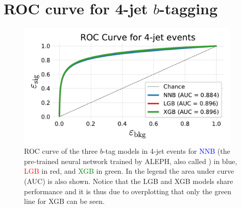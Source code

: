 \section[ROC curve for 4-jet b-tagging]{ROC curve for 4-jet $b$-tagging}
\begin{figure}
  \includegraphics[width=0.95\textwidth, trim=10 10 10 40, clip]{figures/quarks/ROC_4_jet-down_sample=1.00-ML_vars=vertex-selection=b-ejet_min=4-n_iter_RS_lgb=99-n_iter_RS_xgb=9-cdot_cut=0.90-version=19.pdf}
  \vspace{-0.5cm}
  \caption[ROC curve for 4-jet $b$-tagging]
          {ROC curve of the three $b$-tag models in 4-jet events for \textcolor{blue}{NNB} (the pre-trained neural network trained by ALEPH, also called ) in blue, \textcolor{red}{LGB} in red, and \textcolor{green}{XGB} in green. In the legend the area under curve (AUC) is also shown. Notice that the LGB and XGB models share performance and it is thus due to overplotting that only the green line for XGB can be seen.} 
\end{figure}
\clearpage


\FloatBarrier
